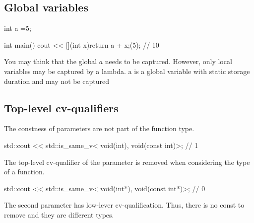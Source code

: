 \documentclass{report}
\begin{document}
    \pagebreak 
    \bigbreak \noindent 
    \subsection{Global variables}
    \bigbreak \noindent 
    \begin{cppcode}
    int a =5;

    int main() {
        cout << [](int x){return a + x;}(5); // 10
    }
    \end{cppcode}
    \bigbreak \noindent 
    You may think that the global $a$ needs to be captured. However, only local variables may be captured by a lambda. a is a global variable with static storage duration and may not be captured

    \pagebreak 
    \bigbreak \noindent 
    \subsection{Top-level cv-qualifiers}
    \bigbreak \noindent 
    The constness of parameters are not part of the function type.
    \bigbreak \noindent 
    \begin{cppcode}
        std::cout << std::is_same_v<
        void(int),
        void(const int)>; // 1
    \end{cppcode}
    \bigbreak \noindent 
    The top-level cv-qualifier of the parameter is removed when considering the type of a function.
    \bigbreak \noindent 
    \begin{cppcode}
        std::cout << std::is_same_v<
        void(int*),
        void(const int*)>; // 0
    \end{cppcode}
    \bigbreak \noindent 
    The second parameter has low-lever cv-qualification. Thus, there is no const to remove and they are different types.
\end{document}
